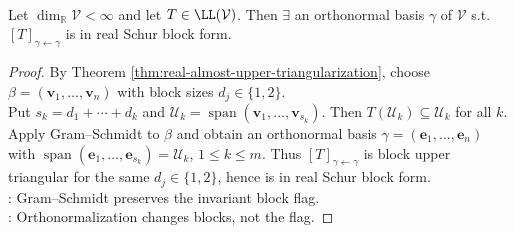 \begin{corollary} \label{cor:real-schur-block-form-orthonormal} \\
Let $\dim_{\mathbb{R}}\mathcal{V}<\infty$ and let $T\in\LL(\mathcal{V})$. Then $\exists$ an orthonormal basis $\gamma$ of $\mathcal{V}$ s.t. $[T]_{\gamma\leftarrow\gamma}$ is in real Schur block form.
\begin{proof}
By Theorem \ref{thm:real-almost-upper-triangularization}, choose $\beta=(\mathbf{v}_1,\ldots,\mathbf{v}_n)$ with block sizes $d_j\in\{1,2\}$.\\
Put $s_k=d_1+\cdots+d_k$ and $\mathcal{U}_k=\operatorname{span}(\mathbf{v}_1,\ldots,\mathbf{v}_{s_k})$. Then $T(\mathcal{U}_k)\subseteq\mathcal{U}_k$ for all $k$.\\
Apply Gram--Schmidt to $\beta$ and obtain an orthonormal basis $\gamma=(\mathbf{e}_1,\ldots,\mathbf{e}_n)$ with $\operatorname{span}(\mathbf{e}_1,\ldots,\mathbf{e}_{s_k})=\mathcal{U}_k$, $1\leq k\leq m$. Thus $[T]_{\gamma\leftarrow\gamma}$ is block upper triangular for the same $d_j\in\{1,2\}$, hence is in real Schur block form.\\
: Gram--Schmidt preserves the invariant block flag.\\
: Orthonormalization changes blocks, not the flag.
\end{proof}
\end{corollary}

